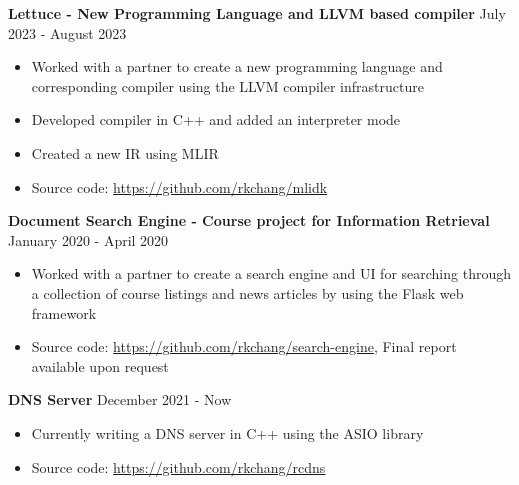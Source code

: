 \documentclass[10pt]{article}
\begin{document}
\textbf{Lettuce - New Programming Language and LLVM based compiler} \hfill July 2023 - August 2023
\begin{itemize}[noitemsep]
    \item Worked with a partner to create a new programming language and corresponding compiler using the LLVM compiler infrastructure
    \item Developed compiler in C++ and added an interpreter mode
    \item Created a new IR using MLIR
    \item Source code: \url{https://github.com/rkchang/mlidk}
\end{itemize}

\textbf{Document Search Engine - Course project for Information Retrieval} \hfill January 2020 - April 2020
\begin{itemize}[noitemsep]
    \item Worked with a partner to create a search engine and UI for searching through a collection of course listings and news articles by using the Flask web framework
    \item Source code: \url{https://github.com/rkchang/search-engine}, Final report available upon request
\end{itemize}

\textbf{DNS Server} \hfill December 2021 - Now
\begin{itemize}[noitemsep]
    \item Currently writing a DNS server in C++ using the ASIO library
    \item Source code: \url{https://github.com/rkchang/rcdns}
\end{itemize}
\end{document}

